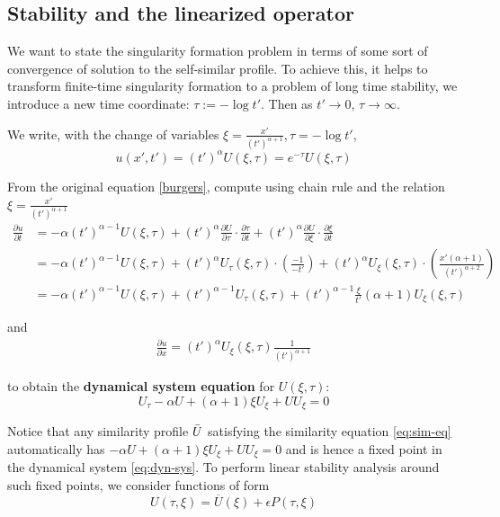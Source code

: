 \documentclass[11pt,a4paper]{article}
\begin{document}
\subsection{Stability and the linearized operator}
We want to state the singularity formation problem in terms of some sort of convergence of solution to the self-similar profile. To achieve this, it helps to transform finite-time singularity formation to a problem of long time stability, we introduce a new time coordinate: $\tau := -\log t'$. Then as $t'\to 0$, $\tau \to \infty$.

We write, with the change of variables $\xi = \frac{x'}{(t')^{\alpha+1}}, \tau = -\log t'$,
\begin{equation}\label{eq:ansatz-sim-coor}
    u(x', t') = (t')^\alpha U(\xi, \tau) = e^{-\tau} U(\xi, \tau)
\end{equation}

From the original equation \eqref{burgers}, compute using chain rule and the relation $\xi = \frac{x'}{(t')^{\alpha+1}}$
\begin{align*}
    \frac{\partial u}{\partial t} &= -\alpha (t')^{\alpha-1} U(\xi, \tau) + (t')^\alpha \frac{\partial U}{\partial\tau}\cdot\frac{\partial\tau}{\partial t} + (t')^\alpha \frac{\partial U}{\partial\xi}\cdot\frac{\partial\xi}{\partial t}\\
    &= -\alpha (t')^{\alpha-1} U(\xi, \tau) + (t')^\alpha U_\tau(\xi, \tau)\cdot\left(\frac{-1}{-t'}\right) + (t')^\alpha U_\xi(\xi, \tau)\cdot\left(\frac{x'(\alpha+1)}{(t')^{\alpha+2}}\right) \\
    &= -\alpha (t')^{\alpha-1} U(\xi, \tau) + (t')^{\alpha-1} U_\tau(\xi, \tau) + (t')^{\alpha-1} \frac{\xi}{t'}(\alpha+1)U_\xi(\xi, \tau)
\end{align*}

and
\begin{align*}
    \frac{\partial u}{\partial x} = (t')^\alpha U_\xi(\xi, \tau)\frac{1}{(t')^{\alpha + 1}}
\end{align*}

to obtain the \textbf{dynamical system equation} for $U(\xi, \tau)$:
\begin{equation}\label{eq:dyn-sys}
    U_\tau - \alpha U + (\alpha+1)\xi U_\xi + UU_\xi = 0
\end{equation}

Notice that any similarity profile $\Bar{U}$ satisfying the similarity equation \ref{eq:sim-eq} automatically has $-\alpha U + (\alpha+1)\xi U_\xi + UU_\xi = 0$ and is hence a fixed point in the dynamical system \ref{eq:dyn-sys}. To perform linear stability analysis around such fixed points, we consider functions of form 
\begin{equation*}
    U(\tau, \xi) = \overline{U}(\xi) + \epsilon P(\tau, \xi)
\end{equation*}
\end{document}
